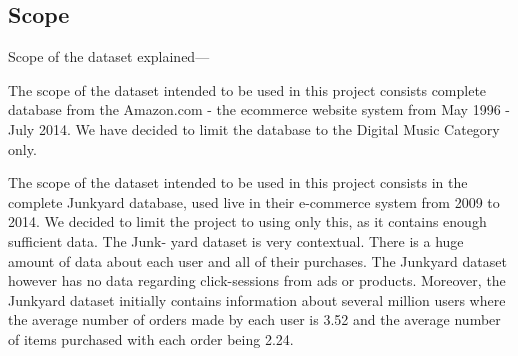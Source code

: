 \subsection{Scope}

Scope of the dataset explained---

The scope of the dataset intended to be used in this project consists complete database from the Amazon.com - the ecommerce website system from May 1996 - July 2014. We have decided to limit the database to the Digital Music Category only. 


The scope of the dataset intended to be used in this project consists in the complete
Junkyard database, used live in their e-commerce system from 2009 to 2014. We decided
to limit the project to using only this, as it contains enough sufficient data. The Junk-
yard dataset is very contextual. There is a huge amount of data about each user and all
of their purchases. The Junkyard dataset however has no data regarding click-sessions
from ads or products.
Moreover, the Junkyard dataset initially contains information about several million users
where the average number of orders made by each user is 3.52 and the average number
of items purchased with each order being 2.24.


